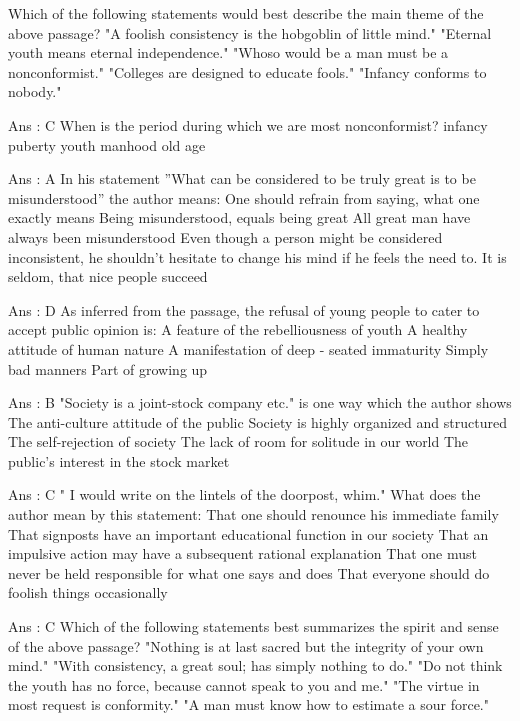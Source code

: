     Which of the following statements would best describe the main theme of the above passage?
        "A foolish consistency is the hobgoblin of little mind."
        "Eternal youth means eternal independence."
        "Whoso would be a man must be a nonconformist."
        "Colleges are designed to educate fools."
        "Infancy conforms to nobody." 

    Ans : C
    When is the period during which we are most nonconformist?
        infancy
        puberty
        youth
        manhood
        old age 

    Ans : A
    In his statement ''What can be considered to be truly great is to be misunderstood'' the author means:
        One should refrain from saying, what one exactly means
        Being misunderstood, equals being great
        All great man have always been misunderstood
        Even though a person might be considered inconsistent, he shouldn't hesitate to change his mind if he feels the need to.
        It is seldom, that nice people succeed 

    Ans : D
    As inferred from the passage, the refusal of young people to cater to accept public opinion is:
        A feature of the rebelliousness of youth
        A healthy attitude of human nature
        A manifestation of deep - seated immaturity
        Simply bad manners
        Part of growing up 

    Ans : B
    "Society is a joint-stock company etc." is one way which the author shows
        The anti-culture attitude of the public
        Society is highly organized and structured
        The self-rejection of society
        The lack of room for solitude in our world
        The public's interest in the stock market 

    Ans : C
    " I would write on the lintels of the doorpost, whim." What does the author mean by this statement:
        That one should renounce his immediate family
        That signposts have an important educational function in our society
        That an impulsive action may have a subsequent rational explanation
        That one must never be held responsible for what one says and does
        That everyone should do foolish things occasionally 

    Ans : C
    Which of the following statements best summarizes the spirit and sense of the above passage?
        "Nothing is at last sacred but the integrity of your own mind."
        "With consistency, a great soul; has simply nothing to do."
        "Do not think the youth has no force, because cannot speak to you and me."
        "The virtue in most request is conformity."
        "A man must know how to estimate a sour force." 

